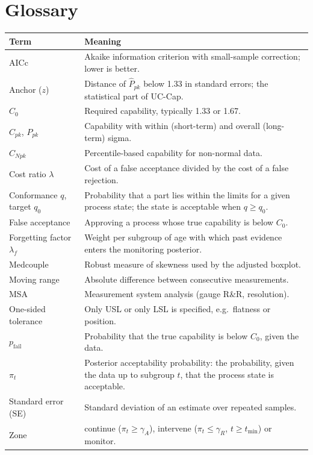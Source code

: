 \documentclass[a4paper,11pt,oneside,openany,parskip=half-,headings=standardclasses,toc=flat,numbers=noenddot]{scrbook}
\newcommand{\thead}[1]{{\sffamily\bfseries\footnotesize #1}}
\newcommand{\Ppkhat}{\widehat{P}_{pk}}
\begin{document}
\chapter{Glossary}\label{app:glossary}

\begin{table}[!htp]
\small
\begin{tabularx}{\textwidth}{@{}P{32mm}L@{}}
\toprule
\thead{Term} & \thead{Meaning}\\
\midrule
AICc & Akaike information criterion with small-sample correction; lower is better.\\
Anchor ($z$) & Distance of $\Ppkhat$ below 1.33 in standard errors; the statistical part of UC-Cap.\\
$C_0$ & Required capability, typically 1.33 or 1.67.\\
$C_{pk}$, $P_{pk}$ & Capability with within (short-term) and overall (long-term) sigma.\\
$C_{Npk}$ & Percentile-based capability for non-normal data.\\
Cost ratio $\lambda$ & Cost of a false acceptance divided by the cost of a false rejection.\\
Conformance $q$, target $q_0$ & Probability that a part lies within the limits for a given process state; the state is acceptable when $q \ge q_0$.\\
False acceptance & Approving a process whose true capability is below $C_0$.\\
Forgetting factor $\lambda_f$ & Weight per subgroup of age with which past evidence enters the monitoring posterior.\\
Medcouple & Robust measure of skewness used by the adjusted boxplot.\\
Moving range & Absolute difference between consecutive measurements.\\
MSA & Measurement system analysis (gauge R\&R, resolution).\\
One-sided tolerance & Only USL or only LSL is specified, e.g.\ flatness or position.\\
$p_{\text{fail}}$ & Probability that the true capability is below $C_0$, given the data.\\
$\pi_t$ & Posterior acceptability probability: the probability, given the data up to subgroup $t$, that the process state is acceptable.\\
Standard error (SE) & Standard deviation of an estimate over repeated samples.\\
Zone & continue ($\pi_t \ge \gamma_A$), intervene ($\pi_t \le \gamma_R$, $t \ge t_{\min}$) or monitor.\\
\bottomrule
\end{tabularx}
\end{table}
\end{document}
